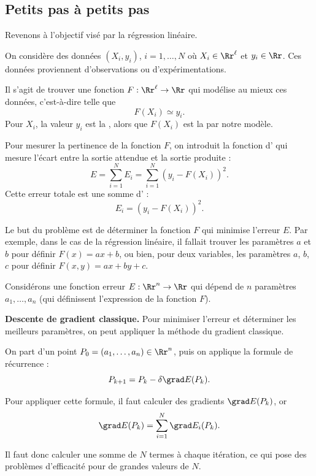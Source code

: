 \documentclass[11pt,class=report,crop=false]{standalone}
\begin{document}
\subsection{Petits pas à petits pas}

Revenons à l'objectif visé par la régression linéaire.

On considère des données $(X_i,y_i)$, $i=1,\ldots,N$ où $X_i \in \Rr^\ell$ et $y_i \in \Rr$.
Ces données proviennent d'observations ou d'expérimentations. 

Il s'agit de trouver une fonction $F : \Rr^\ell \to \Rr $ qui modélise au mieux ces données, c'est-à-dire telle que 
$$F(X_i) \simeq y_i.$$
Pour  $X_i$, la valeur $y_i$ est la , alors que $F(X_i)$ est la  par notre modèle. 

Pour mesurer la pertinence de la fonction $F$, on introduit la fonction d' qui mesure l'écart entre la sortie attendue et la sortie produite :
$$E = \sum_{i=1}^N E_i =  \sum_{i=1}^N(y_i - F(X_i))^2.$$
Cette erreur totale est une somme d' :
$$E_i =  (y_i - F(X_i))^2.$$

Le but du problème est de déterminer la fonction $F$ qui minimise l'erreur $E$.
Par exemple, dans le cas de la régression linéaire, il fallait trouver les paramètres $a$ et $b$ pour définir $F(x) = ax+b$, ou bien, pour deux variables, les paramètres $a$, $b$, $c$ pour définir $F(x,y) = ax+by+c$.

Considérons une fonction erreur $E : \Rr^n \to \Rr$ qui dépend de $n$ paramètres $a_1,\ldots,a_n$ (qui définissent l'expression de la fonction $F$). 

\bigskip

\textbf{Descente de gradient classique.}
Pour minimiser l'erreur et déterminer les meilleurs paramètres, on peut appliquer la méthode du gradient classique.

On part d'un point $P_0 = (a_1,\ldots,a_n) \in \Rr^n$, puis on applique la formule de récurrence :
$$P_{k+1} = P_k - \delta \grad E (P_k).$$


Pour appliquer cette formule, il faut calculer des gradients $\grad E(P_k)$, or
$$\grad E(P_k) = \sum_{i=1}^N \grad E_i(P_k).$$

Il faut donc calculer une somme de $N$ termes à chaque itération, ce qui pose des problèmes d'efficacité pour de grandes valeurs de $N$.

\bigskip
\end{document}

